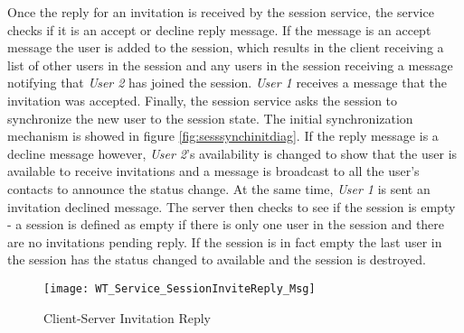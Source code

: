 Once the reply for an invitation is received by the session service, the service checks if it is an accept or decline reply message. If the message is an accept message the user is added to the session, which results in the client receiving a list of other users in the session and any users in the session receiving a message notifying that \textit{User 2} has joined the session. \textit{User 1} receives a message that the invitation was accepted. Finally, the session service asks the session to synchronize the new user to the session state. The initial synchronization mechanism is showed in figure \ref{fig:sesssynchinitdiag}. If the reply message is a decline message however, \textit{User 2}'s availability is changed to show that the user is available to receive invitations and a message is broadcast to all the user's contacts to announce the status change. At the same time, \textit{User 1} is sent an invitation declined message. The server then checks to see if the session is empty - a session is defined as empty if there is only one user in the session and there are no invitations pending reply. If the session is in fact empty the last user in the session has the status changed to available and the session is destroyed.

\begin{figure}
	\centering
	\texttt{[image: WT\_Service\_SessionInviteReply\_Msg]}
	\caption{Client-Server Invitation Reply}
	\label{fig:sessinvitereplydiag}
\end{figure}

